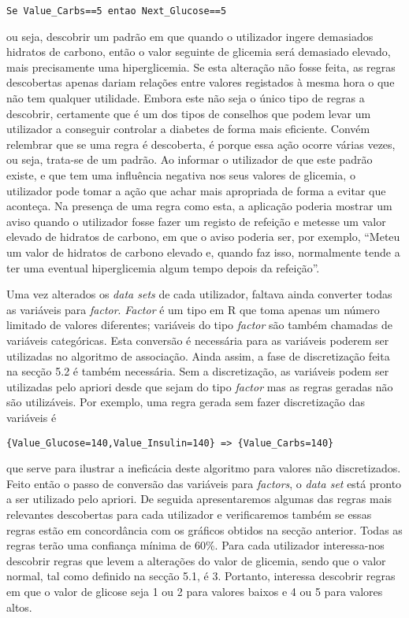 \begin{lstlisting}
Se Value_Carbs==5 entao Next_Glucose==5
\end{lstlisting} 

ou seja, descobrir um padrão em que quando o utilizador ingere demasiados hidratos de carbono, então o valor seguinte de glicemia será demasiado elevado, mais precisamente uma hiperglicemia. Se esta alteração não fosse feita, as regras descobertas apenas dariam relações entre valores registados à mesma hora o que não tem qualquer utilidade. Embora este não seja o único tipo de regras a descobrir, certamente que é um dos tipos de conselhos que podem levar um utilizador a conseguir controlar a diabetes de forma mais eficiente. Convém relembrar que se uma regra é descoberta, é porque essa ação ocorre várias vezes, ou seja, trata-se de um padrão. Ao informar o utilizador de que este padrão existe, e que tem uma influência negativa nos seus valores de glicemia, o utilizador pode tomar a ação que achar mais apropriada de forma a evitar que aconteça. Na presença de uma regra como esta, a aplicação poderia mostrar um aviso quando o utilizador fosse fazer um registo de refeição e metesse um valor elevado de hidratos de carbono, em que o aviso poderia ser, por exemplo, ``Meteu um valor de hidratos de carbono elevado e, quando faz isso, normalmente tende a ter uma eventual hiperglicemia algum tempo depois da refeição''.

Uma vez alterados os \textit{data sets} de cada utilizador, faltava ainda converter todas as variáveis para \textit{factor}. \textit{Factor} é um tipo em R que toma apenas um número limitado de valores diferentes; variáveis do tipo \textit{factor} são também chamadas de variáveis categóricas. Esta conversão é necessária para as variáveis poderem ser utilizadas no algoritmo de associação. Ainda assim, a fase de discretização feita na secção 5.2 é também necessária. Sem a discretização, as variáveis podem ser utilizadas pelo apriori desde que sejam do tipo \textit{factor} mas as regras geradas não são utilizáveis. Por exemplo, uma regra gerada sem fazer discretização das variáveis é

\begin{lstlisting}
{Value_Glucose=140,Value_Insulin=140} => {Value_Carbs=140}
\end{lstlisting}

que serve para ilustrar a ineficácia deste algoritmo para valores não discretizados. Feito então o passo de conversão das variáveis para \textit{factors}, o \textit{data set} está pronto a ser utilizado pelo apriori. De seguida apresentaremos algumas das regras mais relevantes descobertas para cada utilizador e verificaremos também se essas regras estão em concordância com os gráficos obtidos na secção anterior. Todas as regras terão uma confiança mínima de 60\%.
Para cada utilizador interessa-nos descobrir regras que levem a alterações do valor de glicemia, sendo que o valor normal, tal como definido na secção 5.1, é 3. Portanto, interessa descobrir regras em que o valor de glicose seja 1 ou 2 para valores baixos e 4 ou 5 para valores altos.

